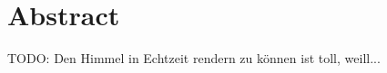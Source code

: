 \section*{Abstract}
\label{sec:abstract}

TODO: Den Himmel in Echtzeit rendern zu können ist toll, weill...
